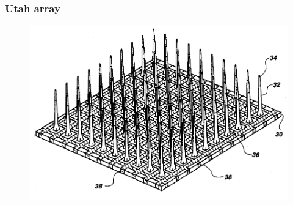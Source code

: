 \documentclass[12pt, aspectratio=169]{beamer}
\begin{document}

\begin{frame}
  \frametitle{Utah array}
  \begin{figure}
    \includegraphics[width=0.7\linewidth]{Utah_array_pat5215088}
  \end{figure}
\end{frame}


\end{document}
